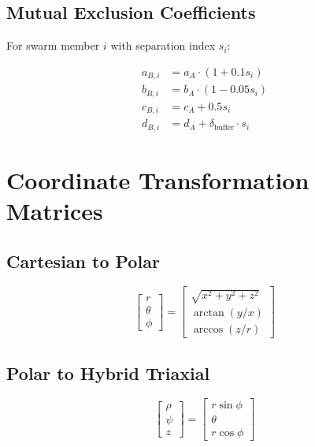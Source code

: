 \documentclass[11pt,a4paper]{article}
\theoremstyle{definition}
\theoremstyle{plain}
\newcommand{\dbuffer}{\delta_{\text{buffer}}}
\begin{document}
\subsection{Mutual Exclusion Coefficients}

For swarm member $i$ with separation index $s_i$:

\begin{align}
a_{B,i} &= a_A \cdot (1 + 0.1s_i) \\
b_{B,i} &= b_A \cdot (1 - 0.05s_i) \\
c_{B,i} &= c_A + 0.5s_i \\
d_{B,i} &= d_A + \dbuffer \cdot s_i
\end{align}

\section{Coordinate Transformation Matrices}

\subsection{Cartesian to Polar}

\begin{equation}
\begin{bmatrix}
r \\ \theta \\ \phi
\end{bmatrix} = 
\begin{bmatrix}
\sqrt{x^2 + y^2 + z^2} \\
\arctan(y/x) \\
\arccos(z/r)
\end{bmatrix}
\end{equation}

\subsection{Polar to Hybrid Triaxial}

\begin{equation}
\begin{bmatrix}
\rho \\ \psi \\ z
\end{bmatrix} = 
\begin{bmatrix}
r\sin\phi \\
\theta \\
r\cos\phi
\end{bmatrix}
\end{equation}
\end{document}
